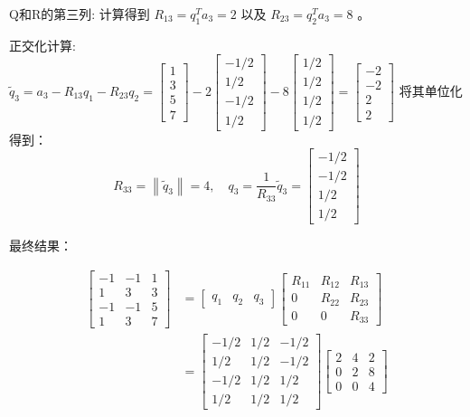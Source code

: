 \begin{example}
Q和R的第三列:
计算得到 $R_{13}=q_{1}^{T} a_{3}=2$ 以及 $R_{23}=q_{2}^{T} a_{3}=8$ 。

正交化计算:
$\tilde{q}_{3}=a_{3}-R_{13} q_{1}-R_{23} q_{2}=\left[\begin{array}{l}1 \\ 3 \\ 5 \\ 7\end{array}\right]-2\left[\begin{array}{r}-1 / 2 \\ 1 / 2 \\ -1 / 2 \\ 1 / 2\end{array}\right]-8\left[\begin{array}{l}1 / 2 \\ 1 / 2 \\ 1 / 2 \\ 1 / 2\end{array}\right]=\left[\begin{array}{r}-2 \\ -2 \\ 2 \\ 2\end{array}\right]$
将其单位化得到：
$$
R_{33}=\left\|\tilde{q}_{3}\right\|=4, \quad q_{3}=\frac{1}{R_{33}} \tilde{q}_{3}=\left[\begin{array}{c}
-1 / 2 \\
-1 / 2 \\
1 / 2 \\
1 / 2
\end{array}\right]
$$

最终结果：

$$
\begin{aligned}
\left[\begin{array}{rrr}
-1 & -1 & 1 \\
1 & 3 & 3 \\
-1 & -1 & 5 \\
1 & 3 & 7
\end{array}\right] &=\left[\begin{array}{lll}
q_{1} & q_{2} & q_{3}
\end{array}\right]\left[\begin{array}{ccc}
R_{11} & R_{12} & R_{13} \\
0 & R_{22} & R_{23} \\
0 & 0 & R_{33}
\end{array}\right] \\
&=\left[\begin{array}{rrr}
-1 / 2 & 1 / 2 & -1 / 2 \\
1 / 2 & 1 / 2 & -1 / 2 \\
-1 / 2 & 1 / 2 & 1 / 2 \\
1 / 2 & 1 / 2 & 1 / 2
\end{array}\right]\left[\begin{array}{rrr}
2 & 4 & 2 \\
0 & 2 & 8 \\
0 & 0 & 4
\end{array}\right]
\end{aligned}
$$
\end{example}



